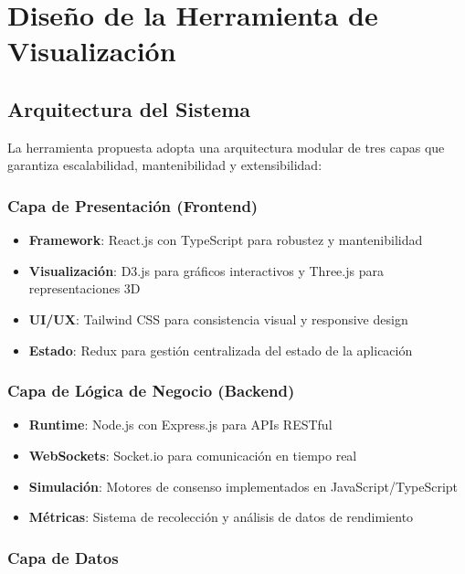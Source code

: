 \documentclass[spanish,12pt,letterpaper]{report}
\begin{document}
\section{Diseño de la Herramienta de Visualización}

\subsection{Arquitectura del Sistema}

La herramienta propuesta adopta una arquitectura modular de tres capas que garantiza escalabilidad, mantenibilidad y extensibilidad:

\subsubsection{Capa de Presentación (Frontend)}

\begin{itemize}
    \item \textbf{Framework}: React.js con TypeScript para robustez y mantenibilidad
    \item \textbf{Visualización}: D3.js para gráficos interactivos y Three.js para representaciones 3D
    \item \textbf{UI/UX}: Tailwind CSS para consistencia visual y responsive design
    \item \textbf{Estado}: Redux para gestión centralizada del estado de la aplicación
\end{itemize}

\subsubsection{Capa de Lógica de Negocio (Backend)}

\begin{itemize}
    \item \textbf{Runtime}: Node.js con Express.js para APIs RESTful
    \item \textbf{WebSockets}: Socket.io para comunicación en tiempo real
    \item \textbf{Simulación}: Motores de consenso implementados en JavaScript/TypeScript
    \item \textbf{Métricas}: Sistema de recolección y análisis de datos de rendimiento
\end{itemize}

\subsubsection{Capa de Datos}
\end{document}
